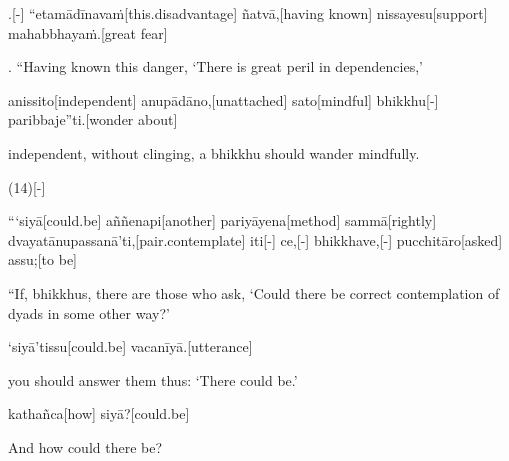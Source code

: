\begin{samepage}
.[-] “etamādīnavaṁ[this.disadvantage] ñatvā,[having known] nissayesu[support] mahabbhayaṁ.[great fear]
\endgl
\nopagebreak
\linespread{0.5}
\begin{spacin}{0.2}
{. “Having known this danger, ‘There is great peril in dependencies,’}
\end{spacin}
\vskip 12pt
\end{samepage}
\begin{samepage}
\begingl[glneveryline={\PaliGlossA,\PaliGlossB}]
anissito[independent] anupādāno,[unattached] sato[mindful] bhikkhu[-] paribbaje”ti.[wonder about]
\endgl
\nopagebreak
\linespread{0.5}
\begin{spacin}{0.2}
{\PaliGlossFT independent, without clinging, a bhikkhu should wander mindfully.}
\end{spacin}
\vskip 12pt
\end{samepage}
\vskip 0.2in
\begin{samepage}
\begingl[glneveryline={\PaliGlossA,\PaliGlossB}]
(14)[-]
\endgl
\nopagebreak
\linespread{0.5}
\begin{spacin}{0.2}
{}
\end{spacin}
\vskip 12pt
\end{samepage}
\begin{samepage}
\begingl[glneveryline={\PaliGlossA,\PaliGlossB}]
“‘siyā[could.be] aññenapi[another] pariyāyena[method] sammā[rightly] dvayatānupassanā’ti,[pair.contemplate] iti[-] ce,[-] bhikkhave,[-] pucchitāro[asked] assu;[to be]
\endgl
\nopagebreak
\linespread{0.5}
\begin{spacin}{0.2}
{\PaliGlossFT “If, bhikkhus, there are those who ask, ‘Could there be correct contemplation of dyads in some other way?’}
\end{spacin}
\vskip 12pt
\end{samepage}
\begin{samepage}
\begingl[glneveryline={\PaliGlossA,\PaliGlossB}]
‘siyā’tissu[could.be] vacanīyā.[utterance]
\endgl
\nopagebreak
\linespread{0.5}
\begin{spacin}{0.2}
{\PaliGlossFT you should answer them thus: ‘There could be.’}
\end{spacin}
\vskip 12pt
\end{samepage}
\begin{samepage}
\begingl[glneveryline={\PaliGlossA,\PaliGlossB}]
kathañca[how] siyā?[could.be]
\endgl
\nopagebreak
\linespread{0.5}
\begin{spacin}{0.2}
{\PaliGlossFT And how could there be?}
\end{spacin}
\vskip 12pt
\end{samepage}
